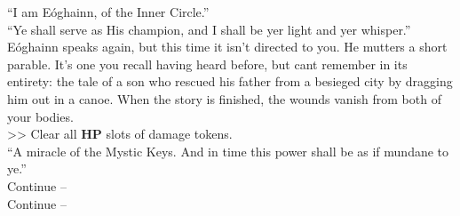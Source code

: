 “I am Eóghainn, of the Inner Circle.”\\

“Ye shall serve as His champion, and I shall be yer light and yer whisper.”\\

Eóghainn speaks again, but this time it isn’t directed to you. He mutters a short parable. It’s one you recall having heard before, but cant remember in its entirety: the tale of a son who rescued his father from a besieged city by dragging him out in a canoe. When the story is finished, the wounds vanish from both of your bodies.\\
>> Clear all \textbf{HP} slots of damage tokens.\\

“A miracle of the Mystic Keys. And in time this power shall be as if mundane to ye.”\\

 Continue -- \\
 Continue -- 
